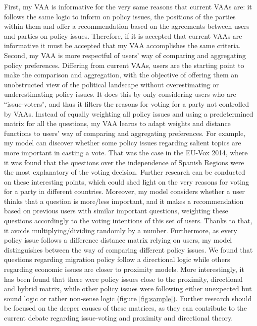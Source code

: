 \documentclass{scrartcl}
\begin{document}
First, my VAA is informative for the very same reasons that current VAAs are: it follows the same logic to inform on policy issues, the positions of the parties within them and offer a recommendation based on the agreements between users and parties on policy issues. Therefore, if it is accepted that current VAAs are informative it must be accepted that my VAA accomplishes the same criteria. 
\\

Second, my VAA is more respectful of users' way of comparing and aggregating policy preferences. Differing from current VAAs, users are the starting point to make the comparison and aggregation, with the objective of offering them an unobstructed view of the political landscape without overestimating or underestimating policy issues. It does this by only considering users who are ``issue-voters", and thus it filters the reasons for voting for a party not controlled by VAAs.  Instead of equally weighting all policy issues and using a predetermined matrix for all the questions, my VAA learns to adapt weights and distance functions to users' way of comparing and aggregating preferences. For example, my model can discover whether some policy issues regarding salient topics are more important in casting a vote. That was the case in the EU-Vox 2014, where it was found that the questions over the independence of Spanish Regions were the most explanatory of the voting decision. Further research can be conducted on these interesting points, which could shed light on the very reasons for voting for a party in different countries. Moreover, my model considers whether a user thinks that a question is more/less important, and it makes a recommendation based on previous users with similar important questions, weighting these questions accordingly to the voting intentions of this set of users. Thanks to that, it avoids multiplying/dividing randomly by a number. Furthermore, as every policy issue follows a difference distance matrix relying on users, my model distinguishes between the way of comparing different policy issues. We found that questions regarding migration policy follow a directional logic while others regarding economic issues are closer to proximity models. More interestingly, it has been found that there were policy issues close to the proximity, directional and hybrid matrix, while other policy issues were following either unexpected but sound logic or rather non-sense logic (figure \ref{fig:sample}). Further research should be focused on the deeper causes of these matrices, as they can contribute to the current debate regarding issue-voting and proximity and directional theory.
\end{document}
